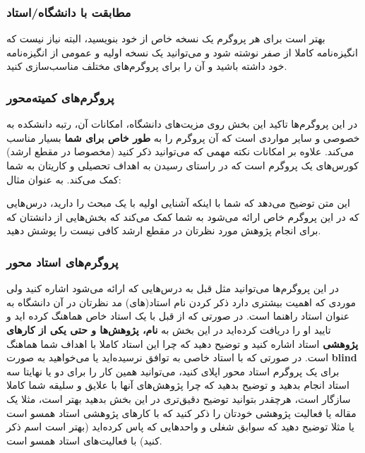 \subsubsection{مطابقت با دانشگاه/استاد }
بهتر است برای هر پروگرم یک نسخه خاص از  خود بنویسید، البته نیاز نیست که انگیزه‌نامه کاملا از صفر نوشته شود و می‌توانید یک نسخه اولیه و عمومی از 
انگیزه‌نامه خود داشته باشید و آن را برای پروگرم‌های مختلف مناسب‌سازی کنید. 

\subsubsection{پروگرم‌های کمیته‌محور}
در این پروگرم‌ها تاکید این بخش روی مزیت‌های دانشگاه، امکانات آن، رتبه دانشکده به خصوصی و سایر مواردی است که آن پروگرم را به \textbf{طور خاص برای شما}
بسیار مناسب می‌کند. علاوه بر امکانات نکته مهمی که می‌توانید ذکر کنید (مخصوصا در مقطع ارشد) کورس‌های یک پروگرم است که در راستای رسیدن 
به اهداف تحصیلی و کاریتان به شما کمک می‌کند. به عنوان مثال:

\begin{framed}
\end{framed}

این متن توضیح می‌دهد که شما با اینکه آشنایی اولیه با یک مبحث را دارید، درس‌هایی که در این پروگرم خاص ارائه می‌شود به شما کمک می‌کند که 
بخش‌هایی از دانشتان که برای انجام پژوهش مورد نظرتان در مقطع ارشد کافی نیست را پوشش دهید. 


\subsubsection{پروگرم‌های استاد محور}
در این پروگرم‌ها می‌توانید مثل قبل به درس‌هایی که ارائه می‌شود اشاره کنید ولی موردی که اهمیت بیشتری دارد ذکر کردن نام استاد(های) مد نظرتان 
در آن دانشگاه به عنوان استاد راهنما است. در صورتی که از قبل با یک استاد خاص هماهنگ کرده اید و تایید او را دریافت کرده‌اید در این بخش 
به \textbf{نام، پژوهش‌ها و حتی یکی از کارهای پژوهشی } استاد اشاره کنید و توضیح دهید که چرا این استاد کاملا با اهداف شما هماهنگ است. 
در صورتی که با استاد خاصی به توافق نرسیده‌اید یا می‌خواهید به صورت \textbf{blind} برای یک پروگرم استاد محور اپلای کنید، می‌توانید همین کار
را برای دو یا نهایتا سه استاد انجام بدهید و توضیح بدهید که چرا پژوهش‌های آنها با علایق و سلیقه شما کاملا سازگار است، هرچقدر بتوانید توضیح دقیق‌تری
در این بخش بدهید بهتر است، مثلا یک مقاله یا فعالیت پژوهشی خودتان را ذکر کنید که با کارهای پژوهشی استاد همسو است یا مثلا توضیح دهید که 
سوابق شغلی و واحد‌هایی که پاس کرده‌اید (بهتر است اسم ذکر کنید) با فعالیت‌های استاد همسو است. 

